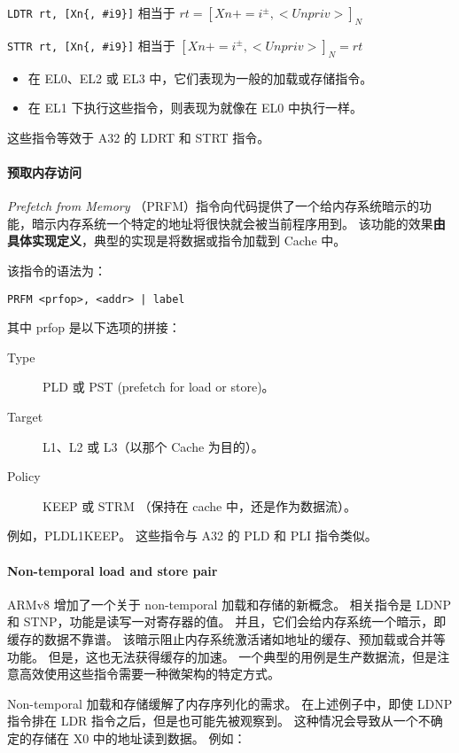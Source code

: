 \lstinline!LDTR rt, [Xn{, #i9}]! 相当于 $rt = [Xn += i^{\pm}, <Unpriv>]_N$

\lstinline!STTR rt, [Xn{, #i9}]! 相当于 $[Xn += i^{\pm}, <Unpriv>]_N = rt$

\begin{itemize}
  \item 在 EL0、EL2 或 EL3 中，它们表现为一般的加载或存储指令。
  \item 在 EL1 下执行这些指令，则表现为就像在 EL0 中执行一样。
\end{itemize}
 
这些指令等效于 A32 的 LDRT 和 STRT 指令。

\paragraph{预取内存访问}

\textit{Prefetch from Memory} （PRFM）指令向代码提供了一个给内存系统暗示的功能，暗示内存系统一个特定的地址将很快就会被当前程序用到。
该功能的效果\textbf{由具体实现定义}，典型的实现是将数据或指令加载到 Cache 中。

该指令的语法为：

\lstinline!PRFM <prfop>, <addr> | label!

其中 prfop 是以下选项的拼接：

\begin{description}
  \item[Type] PLD 或 PST (prefetch for load or store)。
  \item[Target] L1、L2 或 L3（以那个 Cache 为目的）。
  \item[Policy] KEEP 或 STRM （保持在 cache 中，还是作为数据流）。
\end{description}

例如，PLDL1KEEP。
这些指令与 A32 的 PLD 和 PLI 指令类似。

\paragraph{Non-temporal load and store pair}

ARMv8 增加了一个关于 non-temporal 加载和存储的新概念。
相关指令是 LDNP 和 STNP，功能是读写一对寄存器的值。
并且，它们会给内存系统一个暗示，即缓存的数据不靠谱。
该暗示阻止内存系统激活诸如地址的缓存、预加载或合并等功能。
但是，这也无法获得缓存的加速。
一个典型的用例是生产数据流，但是注意高效使用这些指令需要一种微架构的特定方式。

Non-temporal 加载和存储缓解了内存序列化的需求。
在上述例子中，即使 LDNP 指令排在 LDR 指令之后，但是也可能先被观察到。
这种情况会导致从一个不确定的存储在 X0 中的地址读到数据。
例如：


